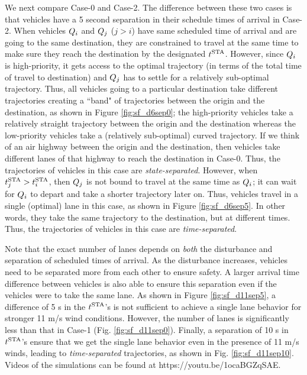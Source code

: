 We next compare Case-0 and Case-2. The difference between these two cases is that vehicles have a 5 second separation in their schedule times of arrival in Case-2. When vehicles $Q_i$ and $Q_{j}$ ($j>i$) have same scheduled time of arrival and are going to the same destination, they are constrained to travel at the same time to make sure they reach the destination by the designated $t^\text{STA}$. However, since $Q_i$ is high-priority, it gets access to the optimal trajectory (in terms of the total time of travel to destination) and $Q_{j}$ has to settle for a relatively sub-optimal trajectory. Thus, all vehicles going to a particular destination take different trajectories creating a ``band" of trajectories between the origin and the destination, as shown in Figure \ref{fig:sf_d6sep0}; the high-priority vehicles take a relatively straight trajectory between the origin and the destination whereas the low-priority vehicles take a (relatively sub-optimal) curved trajectory. If we think of an air highway between the origin and the destination, then vehicles take different lanes of that highway to reach the destination in Case-0. Thus, the trajectories of vehicles in this case are \textit{state-separated}. However, when $t^\text{STA}_j > t^\text{STA}_i$, then $Q_j$ is not bound to travel at the same time as $Q_i$; it can wait for $Q_i$ to depart and take a shorter trajectory later on. Thus, vehicles travel in a single (optimal) lane in this case, as shown in Figure \ref{fig:sf_d6sep5}. In other words, they take the same trajectory to the destination, but at different times. Thus, the trajectories of vehicles in this case are \textit{time-separated}. 

Note that the exact number of lanes depends on \textit{both} the disturbance and separation of scheduled times of arrival. As the disturbance increases, vehicles need to be separated more from each other to ensure safety. A larger arrival time difference between vehicles is also able to ensure this separation even if the vehicles were to take the same lane. As shown in Figure \ref{fig:sf_d11sep5}, a difference of 5 s in the $t^\text{STA}$'s is not sufficient to achieve a single lane behavior for stronger 11 m/s wind conditions. However, the number of lanes is significantly less than that in Case-1 (Fig. \ref{fig:sf_d11sep0}). Finally, a separation of 10 s in $t^\text{STA}$'s ensure that we get the single lane behavior even in the presence of 11 m/s winds, leading to \textit{time-separated} trajectories, as shown in Fig. \ref{fig:sf_d11sep10}. Videos of the simulations can be found at https://youtu.be/1ocaBGZqSAE.


